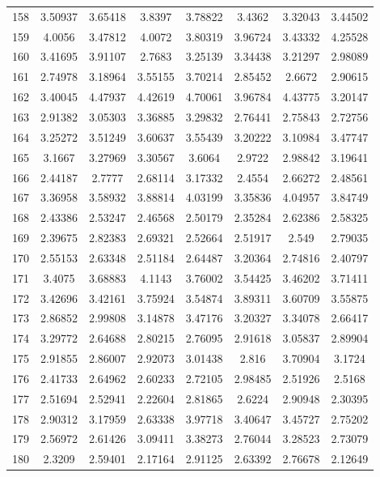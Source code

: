 \begin{center}
\begin{longtable}{cccccccc}
158 & 3.50937 & 3.65418 & 3.8397 & 3.78822 & 3.4362 & 3.32043 & 3.44502\\
159 & 4.0056 & 3.47812 & 4.0072 & 3.80319 & 3.96724 & 3.43332 & 4.25528\\
160 & 3.41695 & 3.91107 & 2.7683 & 3.25139 & 3.34438 & 3.21297 & 2.98089\\
161 & 2.74978 & 3.18964 & 3.55155 & 3.70214 & 2.85452 & 2.6672 & 2.90615\\
162 & 3.40045 & 4.47937 & 4.42619 & 4.70061 & 3.96784 & 4.43775 & 3.20147\\
163 & 2.91382 & 3.05303 & 3.36885 & 3.29832 & 2.76441 & 2.75843 & 2.72756\\
164 & 3.25272 & 3.51249 & 3.60637 & 3.55439 & 3.20222 & 3.10984 & 3.47747\\
165 & 3.1667 & 3.27969 & 3.30567 & 3.6064 & 2.9722 & 2.98842 & 3.19641\\
166 & 2.44187 & 2.7777 & 2.68114 & 3.17332 & 2.4554 & 2.66272 & 2.48561\\
167 & 3.36958 & 3.58932 & 3.88814 & 4.03199 & 3.35836 & 4.04957 & 3.84749\\
168 & 2.43386 & 2.53247 & 2.46568 & 2.50179 & 2.35284 & 2.62386 & 2.58325\\
169 & 2.39675 & 2.82383 & 2.69321 & 2.52664 & 2.51917 & 2.549 & 2.79035\\
170 & 2.55153 & 2.63348 & 2.51184 & 2.64487 & 3.20364 & 2.74816 & 2.40797\\
171 & 3.4075 & 3.68883 & 4.1143 & 3.76002 & 3.54425 & 3.46202 & 3.71411\\
172 & 3.42696 & 3.42161 & 3.75924 & 3.54874 & 3.89311 & 3.60709 & 3.55875\\
173 & 2.86852 & 2.99808 & 3.14878 & 3.47176 & 3.20327 & 3.34078 & 2.66417\\
174 & 3.29772 & 2.64688 & 2.80215 & 2.76095 & 2.91618 & 3.05837 & 2.89904\\
175 & 2.91855 & 2.86007 & 2.92073 & 3.01438 & 2.816 & 3.70904 & 3.1724\\
176 & 2.41733 & 2.64962 & 2.60233 & 2.72105 & 2.98485 & 2.51926 & 2.5168\\
177 & 2.51694 & 2.52941 & 2.22604 & 2.81865 & 2.6224 & 2.90948 & 2.30395\\
178 & 2.90312 & 3.17959 & 2.63338 & 3.97718 & 3.40647 & 3.45727 & 2.75202\\
179 & 2.56972 & 2.61426 & 3.09411 & 3.38273 & 2.76044 & 3.28523 & 2.73079\\
180 & 2.3209 & 2.59401 & 2.17164 & 2.91125 & 2.63392 & 2.76678 & 2.12649\\

\end{longtable}
\end{center}
